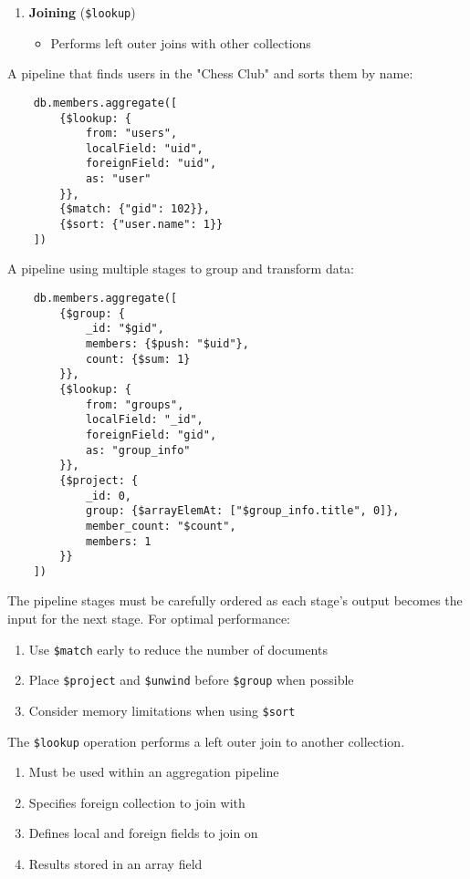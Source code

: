 \begin{enumerate}
  \item \textbf{Joining} (\texttt{\$lookup})
  \begin{itemize}
      \item Performs left outer joins with other collections
  \end{itemize}
\end{enumerate}

\begin{example}
  A pipeline that finds users in the "Chess Club" and sorts them by name:
  \begin{lstlisting}
    db.members.aggregate([
        {$lookup: {
            from: "users",
            localField: "uid",
            foreignField: "uid",
            as: "user"
        }},
        {$match: {"gid": 102}},
        {$sort: {"user.name": 1}}
    ])
  \end{lstlisting}
\end{example}

\begin{example}
  A pipeline using multiple stages to group and transform data:
  \begin{lstlisting}
    db.members.aggregate([
        {$group: {
            _id: "$gid",
            members: {$push: "$uid"},
            count: {$sum: 1}
        }},
        {$lookup: {
            from: "groups",
            localField: "_id",
            foreignField: "gid",
            as: "group_info"
        }},
        {$project: {
            _id: 0,
            group: {$arrayElemAt: ["$group_info.title", 0]},
            member_count: "$count",
            members: 1
        }}
    ])
  \end{lstlisting}
\end{example}

The pipeline stages must be carefully ordered as each stage's output becomes the input for the next stage. For optimal performance:
\begin{enumerate}
  \item Use \texttt{\$match} early to reduce the number of documents
  \item Place \texttt{\$project} and \texttt{\$unwind} before \texttt{\$group} when possible
  \item Consider memory limitations when using \texttt{\$sort}
\end{enumerate}

\begin{definition}[\$lookup]
  The \texttt{\$lookup} operation performs a left outer join to another collection.
  \begin{enumerate}
    \item Must be used within an aggregation pipeline
    \item Specifies foreign collection to join with
    \item Defines local and foreign fields to join on
    \item Results stored in an array field
  \end{enumerate}
\end{definition}

